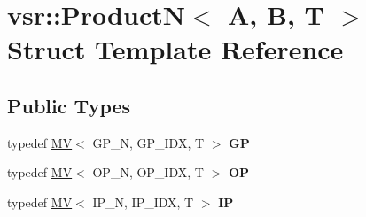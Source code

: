 \hypertarget{structvsr_1_1_product_n}{\section{vsr\-:\-:Product\-N$<$ A, B, T $>$ Struct Template Reference}
\label{structvsr_1_1_product_n}
}
\subsection*{Public Types}
\begin{DoxyCompactItemize}
\item 
\hypertarget{structvsr_1_1_product_n_a752cf3b705398fbed904ec91a4d580e7}{typedef \hyperlink{classvsr_1_1_m_v}{M\-V}$<$ G\-P\-\_\-\-N, G\-P\-\_\-\-I\-D\-X, T $>$ {\bfseries G\-P}}\label{structvsr_1_1_product_n_a752cf3b705398fbed904ec91a4d580e7}

\item 
\hypertarget{structvsr_1_1_product_n_a05a56f8bdb089d7118d76061868d9a24}{typedef \hyperlink{classvsr_1_1_m_v}{M\-V}$<$ O\-P\-\_\-\-N, O\-P\-\_\-\-I\-D\-X, T $>$ {\bfseries O\-P}}\label{structvsr_1_1_product_n_a05a56f8bdb089d7118d76061868d9a24}

\item 
\hypertarget{structvsr_1_1_product_n_a15fb2aec28b6def608a8ae67bf94bbe1}{typedef \hyperlink{classvsr_1_1_m_v}{M\-V}$<$ I\-P\-\_\-\-N, I\-P\-\_\-\-I\-D\-X, T $>$ {\bfseries I\-P}}\label{structvsr_1_1_product_n_a15fb2aec28b6def608a8ae67bf94bbe1}

\end{DoxyCompactItemize}
